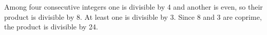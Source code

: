 Among four consecutive integers one is divisible by 4 and another is even, so their product is divisible by 8. At least one is divisible by 3. Since 8 and 3 are coprime, the product is divisible by 24.
